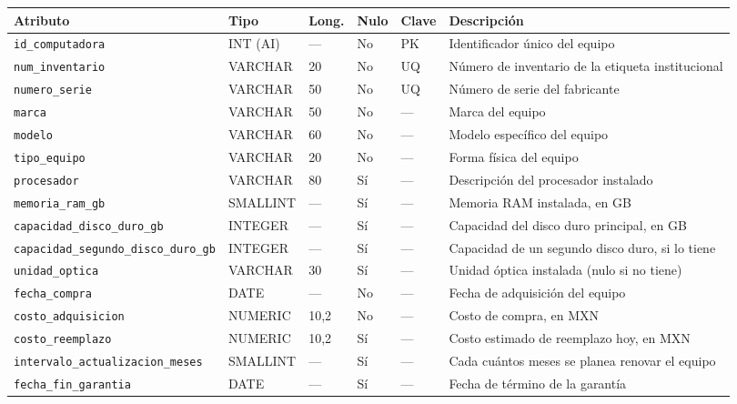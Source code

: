 \documentclass[10pt,a4paper]{article}
\begin{document}
\begin{table}[H]
	\centering
	\footnotesize
	\begin{tabular}{p{4.7cm} | p{1.6cm} | p{0.8cm} | p{0.7cm} | p{1cm} | p{5.4cm}}\hline \hline
		\textbf{Atributo} & \textbf{Tipo} & \textbf{Long.} & \textbf{Nulo} & \textbf{Clave} & \textbf{Descripción} \\ \hline \hline
		\texttt{id\_computadora} & INT (AI) & --- & No & PK & Identificador único del equipo \\ \hline
		\texttt{num\_inventario} & VARCHAR & 20 & No & UQ & Número de inventario de la etiqueta institucional \\ \hline
		\texttt{numero\_serie} & VARCHAR & 50 & No & UQ & Número de serie del fabricante \\ \hline
		\texttt{marca} & VARCHAR & 50 & No & --- & Marca del equipo \\ \hline
		\texttt{modelo} & VARCHAR & 60 & No & --- & Modelo específico del equipo \\ \hline
		\texttt{tipo\_equipo} & VARCHAR & 20 & No & --- & Forma física del equipo \\ \hline
		\texttt{procesador} & VARCHAR & 80 & Sí & --- & Descripción del procesador instalado \\ \hline
		\texttt{memoria\_ram\_gb} & SMALLINT & --- & Sí & --- & Memoria RAM instalada, en GB \\ \hline
		\texttt{capacidad\_disco\_duro\_gb} & INTEGER & --- & Sí & --- & Capacidad del disco duro principal, en GB \\ \hline
		\texttt{capacidad\_segundo\_disco\_duro\_gb} & INTEGER & --- & Sí & --- & Capacidad de un segundo disco duro, si lo tiene \\ \hline
		\texttt{unidad\_optica} & VARCHAR & 30 & Sí & --- & Unidad óptica instalada (nulo si no tiene) \\ \hline
		\texttt{fecha\_compra} & DATE & --- & No & --- & Fecha de adquisición del equipo \\ \hline
		\texttt{costo\_adquisicion} & NUMERIC & 10,2 & No & --- & Costo de compra, en MXN \\ \hline
		\texttt{costo\_reemplazo} & NUMERIC & 10,2 & Sí & --- & Costo estimado de reemplazo hoy, en MXN \\ \hline
		\texttt{intervalo\_actualizacion\_meses} & SMALLINT & --- & Sí & --- & Cada cuántos meses se planea renovar el equipo \\ \hline
		\texttt{fecha\_fin\_garantia} & DATE & --- & Sí & --- & Fecha de término de la garantía \\ \hline

\end{tabular}
\end{table}
\end{document}
